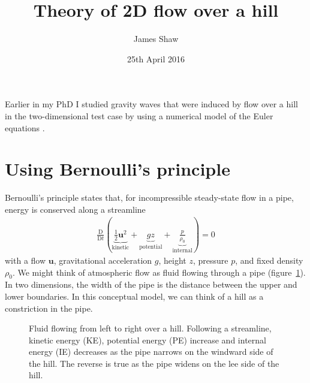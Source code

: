\documentclass{article}
\title{Theory of 2D flow over a hill}
\author{James Shaw}
\date{25th April 2016}
\begin{document}
\maketitle

Earlier in my PhD I studied gravity waves that were induced by flow over a hill in the two-dimensional test case by \citet{schaer2002} using a numerical model of the Euler equations \citep{shaw-weller2016}.

\section{Using Bernoulli's principle}
Bernoulli's principle states that, for incompressible steady-state flow in a pipe, energy is conserved along a streamline \citep{vallis2006}
\begin{align}
	\frac{\mathrm{D}}{\mathrm{D}t} \left( \underbrace{\frac{1}{2}\bm{u}^2}_\text{kinetic} + \underbrace{gz}_\text{potential} + \underbrace{\frac{p}{\rho_0}}_\text{internal} \right) = 0
\end{align}
with a flow $\bm{u}$, gravitational acceleration $g$, height $z$, pressure $p$, and fixed density $\rho_0$.
We might think of atmospheric flow as fluid flowing through a pipe (figure~\ref{fig:pipe}).  In two dimensions, the width of the pipe is the distance between the upper and lower boundaries.  In this conceptual model, we can think of a hill as a constriction in the pipe.

\begin{figure}
	\centering
	\caption{Fluid flowing from left to right over a hill.  Following a streamline, kinetic energy (KE), potential energy (PE) increase and internal energy (IE) decreases as the pipe narrows on the windward side of the hill.  The reverse is true as the pipe widens on the lee side of the hill.}
	\label{fig:pipe}
\end{figure}
\end{document}
